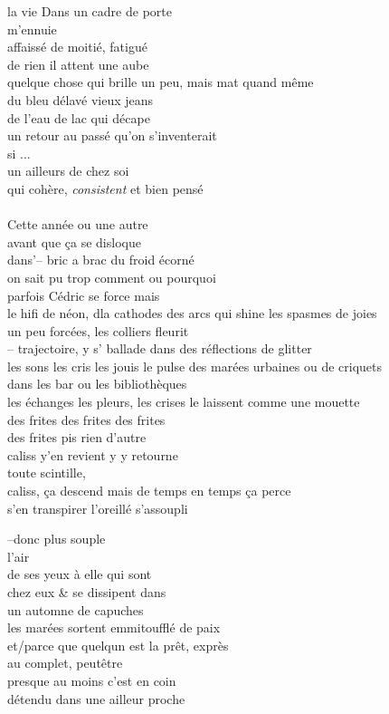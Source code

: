  \renewcommand{\familydefault}{\sfdefault}
la vie
Dans un cadre de porte\\
m'ennuie\\
affaissé de moitié, fatigué\\
de rien il attent une aube\\
quelque chose qui brille un peu, mais mat quand même\\
du bleu délavé vieux jeans\\
de l'eau de lac qui décape\\
un retour au passé qu'on s'inventerait\\
si ... \\
un ailleurs de chez soi \\
qui cohère, \textit{consistent} et bien pensé\\
\\
%
Cette année ou une autre\\
avant que ça se disloque\\
dans'--  bric a brac du froid écorné \\
on sait pu trop comment ou pourquoi\\
parfois Cédric se force mais\\
le hifi de néon, dla cathodes des arcs
qui shine les spasmes de joies\\
un peu forcées, les colliers fleurit\\
-- trajectoire, y s' ballade dans des réflections de glitter\\
les sons les cris les jouis le pulse
des marées urbaines ou de criquets\\
dans les bar ou les bibliothèques\\
les échanges les pleurs, les crises
le laissent comme une mouette\\
des frites des frites des frites\\
des frites pis rien d'autre\\
caliss y'en revient y y retourne \\
toute scintille, \\
caliss, ça descend mais 
de temps en temps ça perce\\
s'en transpirer l'oreillé s'assoupli\\
%
\clearpage
\begin{center}
--donc plus souple\\
l'air\\
de ses yeux à elle qui sont\\
chez eux \& se dissipent dans\\
un automne de capuches\\
les marées sortent emmitoufflé de paix\\
et/parce que quelqun est la prêt, exprès\\
au complet, peutêtre \\
presque au moins c'est en coin\\
détendu dans une ailleur proche\\
\end{center}

